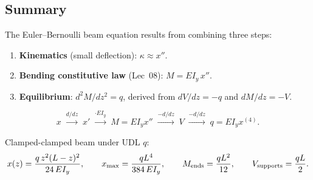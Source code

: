 \documentclass[../main.tex]{subfiles}
\begin{document}
\subsection*{Summary}

The Euler–Bernoulli beam equation results from combining three steps:

\begin{enumerate}
  \item \textbf{Kinematics} (small deflection): $\kappa \approx x''$.
  \item \textbf{Bending constitutive law} (Lec~08): $M = EI_y\,x''$.
  \item \textbf{Equilibrium}: $d^2M/dz^2 = q$, derived from $dV/dz=-q$ and $dM/dz=-V$.
\end{enumerate}

\[
  x \;\xrightarrow{d/dz}\; x' \;\xrightarrow{\cdot EI_y}\; M=EI_y x''
  \;\xrightarrow{-d/dz}\; V \;\xrightarrow{-d/dz}\; q = EI_y x^{(4)}.
\]

Clamped-clamped beam under UDL $q$:
\[
  x(z)=\frac{q\,z^2(L-z)^2}{24\,EI_y}, \qquad
  x_{\max}=\frac{qL^4}{384\,EI_y}, \qquad
  M_{\rm ends}=\frac{qL^2}{12}, \qquad
  V_{\rm supports}=\frac{qL}{2}.
\]
\end{document}
